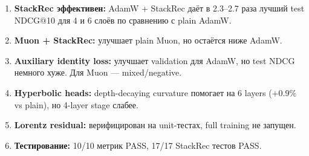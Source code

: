 \documentclass[11pt,a4paper]{article}
\begin{document}
\begin{enumerate}
  \item \textbf{StackRec эффективен:} AdamW + StackRec даёт в 2.3--2.7 раза
        лучший test NDCG@10 для 4 и 6 слоёв по сравнению с plain AdamW.
  \item \textbf{Muon + StackRec:} улучшает plain Muon, но остаётся ниже AdamW.
  \item \textbf{Auxiliary identity loss:} улучшает validation для AdamW,
        но test NDCG немного хуже. Для Muon — mixed/negative.
  \item \textbf{Hyperbolic heads:} depth-decaying curvature помогает на
        6 layers (+0.9\% vs plain), но 4-layer stage слабее.
  \item \textbf{Lorentz residual:} верифицирован на unit-тестах,
        full training не запущен.
  \item \textbf{Тестирование:} 10/10 метрик PASS, 17/17 StackRec тестов PASS.
\end{enumerate}
\end{document}
